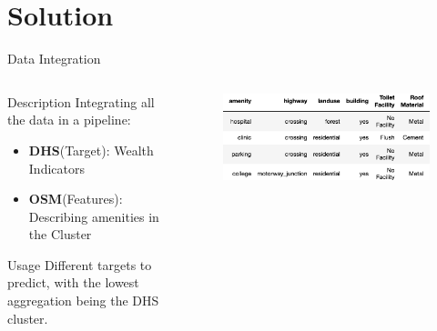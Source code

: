 \documentclass[t]{beamer}
\begin{document}
\section{Solution}
\begin{frame}{Data Integration}
	\begin{columns}[T,totalwidth=\textwidth]
        \begin{column}{0.45\textwidth}
	        \begin{block}{Description}
	           Integrating all the data in a pipeline:
	           \begin{itemize}
	               \item \textbf{DHS}(Target): Wealth Indicators
	               \item \textbf{OSM}(Features): Describing amenities in the Cluster
	           \end{itemize}
	           
	           
	        \end{block}
	        \begin{block}{Usage}
	           Different targets to predict, with the lowest aggregation being the DHS cluster.
	        \end{block}
	    \end{column}
	    
	    \begin{column}{0.55\textwidth}
			\begin{figure}
				\vspace{-\blocktitlesize}
				\includegraphics[height=0.4\paperheight,keepaspectratio]{images/dhs_osm.png}
			\end{figure}
  		\end{column}
  	\end{columns}
\end{frame}
\end{document}
